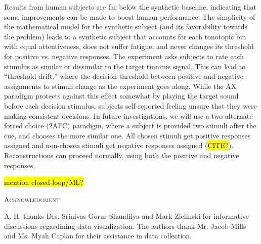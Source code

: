 \documentclass[journal]{IEEEtran}
\begin{document}
Results from human subjects are far below the synthetic baseline,
indicating that some improvements can be made to boost human performance.
The simplicity of the mathematical model for the synthetic subject
(and its favorability towards the problem)
leads to a synthetic subject that accounts for each tonotopic bin
with equal attentiveness, does not suffer fatigue, and never changes its
threshold for positive vs. negative responses.
The experiment asks subjects to rate each stimulus as 
similar or dissimilar to the target tinnitus signal.
This can lead to ``threshold drift,''
where the decision threshold between positive and negative assignments to stimuli
change as the experiment goes along.
While the AX paradigm protects against this effect somewhat
by playing the target sound before each decision stimulus,
subjects self-reported feeling unsure that they were making consistent decisions.
In future investigations,
we will use a two alternate forced choice (2AFC) paradigm,
where a subject is provided two stimuli after the cue,
and chooses the more similar one.
All chosen stimuli get positive responses assigned
and non-chosen stimuli get negative responses assigned (\hl{CITE?}).
Reconstructions can proceed normally, using both the positive and negative responses.

\hl{mention closed-loop/ML?}

\textsc{Acknowledgment}
\par A. H. thanks Drs. Srinivas Gorur-Shandilya and Mark Zielinski for informative discussions regardining data visualization.
The authors thank Mr. Jacob Mills and Ms. Myah Caplan for their assistance in data collection. \\
\end{document}
